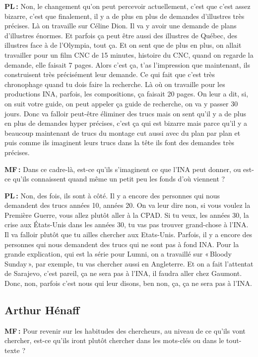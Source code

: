 \textbf{PL :} Non, le changement qu'on peut percevoir actuellement, c'est que c'est assez bizarre, c'est que finalement, il y a de plus en plus de demandes d'illustres très précises. Là on travaille sur Céline Dion. Il va y avoir une demande de plans d'illustres énormes. Et parfois ça peut être aussi des illustres de Québec, des illustres face à de l'Olympia, tout ça. Et on sent que de plus en plus, on allait travailler pour un film CNC de 15 minutes, histoire du CNC, quand on regarde la demande, elle faisait 7 pages. Alors c'est ça, t'as l'impression que maintenant, ils construisent très précisément leur demande. Ce qui fait que c'est très chronophage quand tu dois faire la recherche. Là où on travaille pour les productions INA, parfois, les compositions, ça faisait 20 pages. On leur a dit, si, on suit votre guide, on peut appeler ça guide de recherche, on va y passer 30 jours. Donc va falloir peut-être éliminer des trucs mais on sent qu'il y a de plus en plus de demandes hyper précises, c'est ça qui est bizarre mais parce qu'il y a beaucoup maintenant de trucs du montage cut aussi avec du plan par plan et puis comme ils imaginent leurs trucs dans la tête ils font des demandes très précises.  

\textbf{MF :} Dans ce cadre-là, est-ce qu’ils s'imaginent ce que l'INA peut donner, ou est-ce qu'ils connaissent quand même un petit peu les fonds d'où viennent ? 

\textbf{PL :} Non, des fois, ils sont à côté.  Il y a encore des personnes qui nous demandent des trucs années 10, années 20. On va leur dire non, si vous voulez la Première Guerre, vous allez plutôt aller à la CPAD. Si tu veux, les années 30, la crise aux États-Unis dans les années 30, tu vas pas trouver grand-chose à l'INA. Il va falloir plutôt que tu ailles chercher aux Etats-Unis.  Parfois, il y a encore des personnes qui nous demandent des trucs qui ne sont pas à fond INA.  Pour la grande explication, qui est la série pour Lumni, on a travaillé sur « Bloody Sunday », par exemple, tu vas chercher aussi en Angleterre. Et on a fait l'attentat de Sarajevo, c'est pareil, ça ne sera pas à l’INA, il faudra aller chez Gaumont. Donc, non, parfois c'est nous qui leur disons, ben non, ça, ça ne sera pas à l’INA. 

\subsection*{Arthur Hénaff}

\textbf{MF :} Pour revenir sur les habitudes des chercheurs, au niveau de ce qu'ils vont chercher, est-ce qu'ils iront plutôt chercher dans les mots-clés ou dans le tout-texte ?  

